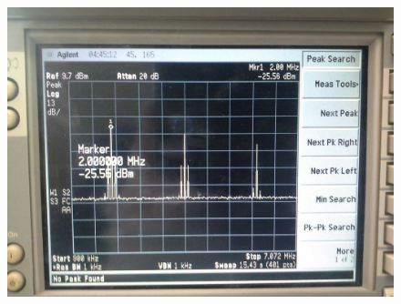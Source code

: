 
\FloatBarrier\begin{figure}[!h]
\centering
\includegraphics[scale=1]{../Grafiken/Frequenzspektrum_c_AmpModuliertTraeger_Oberwellen_0.jpg}
\caption{\label{fig:frequenzspektrum_c_ampmodulierttraeger_oberwellen_0}}
\end{figure}
\FloatBarrier